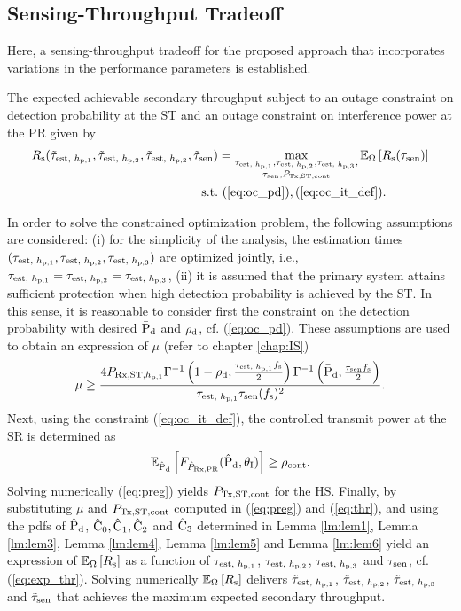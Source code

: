 \subsection{Sensing-Throughput Tradeoff}
Here, a sensing-throughput tradeoff for the proposed approach that incorporates variations in the performance parameters is established. 
\begin{theorem} \label{th:th1}
\normalfont
The expected achievable secondary throughput subject to an outage constraint on detection probability at the ST and an outage constraint on interference power at the PR given by
\begin{align}
R_{\text{s}}(\tilde{\tau}_{\text{est, $h_{\text{p,1}}$}}, \tilde{\tau}_{\text{est, $h_{\text{p,2}}$}}, \tilde{\tau}_{\text{est, $h_{\text{p,3}}$}}, \tilde{\tau}_{\text{sen}}) &= \operatorname*{max}_{\substack{\tau_{\text{est, $h_{\text{p,1}}$}}, \tau_{\text{est, $h_{\text{p,2}}$}}, \tau_{\text{est, $h_{\text{p,3}}$}}, \\ \tau_{\text{sen}}, P_{\text{Tx,ST,cont}}}} {\mathbb E}_{\Omega}\left[ R_{\text{s}}(\tau_{\text{sen}}) \right] \label{eq:opT_em}\\
\text{s.t.} & \text{ } (\ref{eq:oc_pd}), (\ref{eq:oc_it_def}). \nonumber 
\end{align}
\end{theorem}
\begin{IEEEproof}
In order to solve the constrained optimization problem, the following assumptions are considered: (i) for the simplicity of the analysis, the estimation times $(\tau_{\text{est, $h_{\text{p,1}}$}}, \tau_{\text{est, $h_{\text{p,2}}$}}, \tau_{\text{est, $h_{\text{p,3}}$}})$ are optimized jointly, i.e., $\tau_{\text{est, $h_{\text{p,1}}$}} = \tau_{\text{est, $h_{\text{p,2}}$}} = \tau_{\text{est, $h_{\text{p,3}}$}}$, (ii) it is assumed that the primary system attains sufficient protection when high detection probability is achieved by the ST. In this sense, it is reasonable to consider first the constraint on the detection probability with desired $\bar{\text{P}}_{\text{d}}$ and $\rho_{\text{d}}$, cf. (\ref{eq:oc_pd}). These assumptions are used to obtain an expression of $\mu$ (refer to chapter \ref{chap:IS}) 
\begin{align}
\mu \ge \frac{4 P_{\text{Rx,ST,$h_{\text{p,1}}$}} \Gamma^{-1} \left(1 - \rho_{\text{d}}, \frac{\tau_{\text{est, $h_{\text{p,1}}$}} f_{\text{s}}}{2}\right) \Gamma^{-1} \left(\bar{\text{P}}_{\text{d}}, \frac{\tau_{\text{sen}} f_{\text{s}}}{2}\right)}{ \tau_{\text{est, $h_{\text{p,1}}$}} \tau_{\text{sen}} (f_{\text{s}})^2  }. 
\label{eq:thr}
\end{align}
Next, using the constraint (\ref{eq:oc_it_def}), the controlled transmit power at the SR is determined as  
\begin{align}
\e{\epd}{\fprcvdpr(\epd, \ite)} \ge \opc.%
\label{eq:preg}
\end{align}
Solving numerically (\ref{eq:preg}) yields $P_{\text{Tx,ST,cont}}$ for the HS.
Finally, by substituting $\mu$ and $P_{\text{Tx,ST,cont}}$ computed in (\ref{eq:preg}) and (\ref{eq:thr}), and using the pdfs of $\hat{\text{P}}_{\text{d}}$, $\hat{\text{C}}_{\text{0}}, \hat{\text{C}}_{\text{1}}, \hat{\text{C}}_{\text{2}}$ and $\hat{\text{C}}_{\text{3}}$ determined in Lemma \ref{lm:lem1}, Lemma \ref{lm:lem3}, Lemma \ref{lm:lem4}, Lemma \ref{lm:lem5} and Lemma \ref{lm:lem6} yield an expression of ${\mathbb E}_{\Omega}\left[ R_{\text{s}} \right]$ as a function of $\tau_{\text{est, $h_{\text{p,1}}$}}$, $\tau_{\text{est, $h_{\text{p,2}}$}}$, $\tau_{\text{est, $h_{\text{p,3}}$}}$ and $\tau_{\text{sen}}$, cf. (\ref{eq:exp_thr}). Solving numerically ${\mathbb E}_{\Omega}\left[ R_{\text{s}} \right]$ delivers $\tilde{\tau}_{\text{est, $h_{\text{p,1}}$}}$, $\tilde{\tau}_{\text{est, $h_{\text{p,2}}$}}$, $\tilde{\tau}_{\text{est, $h_{\text{p,3}}$}}$ and $\tilde{\tau}_{\text{sen}}$ that achieves the maximum expected secondary throughput.  
\end{IEEEproof}

